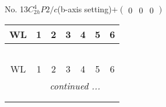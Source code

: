 \documentclass[fleqn,9pt,landscape]{jsarticle}
\begin{document}
\newpage
No. 13\quad$C_{2h}^{4}$\quad$P2/c$\quad(b-axis setting)\quad[ monoclinic ]\quad$+\begin{pmatrix} 0 & 0 & 0 \end{pmatrix}$
\begin{center}
\renewcommand{\arraystretch}{1.2}
\begin{longtable}{ccccccc}
 \hline \hline
WL & 1 & 2 & 3 & 4 & 5 & 6 \\ \hline \endfirsthead

\multicolumn{6}{l}{\tablename\ \thetable{}} \\
 \hline \hline
WL & 1 & 2 & 3 & 4 & 5 & 6 \\ \hline \endhead

 \hline \hline
\multicolumn{6}{r}{\footnotesize\it continued ...} \\ \endfoot

 \hline \hline
\multicolumn{6}{r}{} \\ \endlastfoot


\end{longtable}
\end{center}
\end{document}
